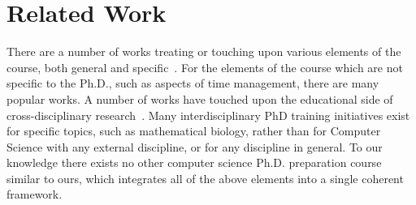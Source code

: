 \section{Related Work}\label{sec:related}

There are a number of works treating or touching upon various elements
of the course, both general and
specific~\cite{phd-not-enough,reshaping-grad-educ,grad-school-survival,
  unwritten-rules,art-sci-investigation,creativity-in-science,res-students-guide}.
For the elements of the course which are not specific to the Ph.D., such
as aspects of time management, there are many popular works.  A number
of works have touched upon the educational side of cross-disciplinary
research~\cite{work-at-boundaries,facilitating-interdisc,
  grand-unif-interdisc,discourse-anal-cross-disc}.  Many
interdisciplinary PhD training initiatives exist for specific topics,
such as mathematical biology, rather than for Computer Science with any
external discipline, or for any discipline in general.  To our knowledge
there exists no other computer science Ph.D. preparation course similar
to ours, which integrates all of the above elements into a single
coherent framework.


